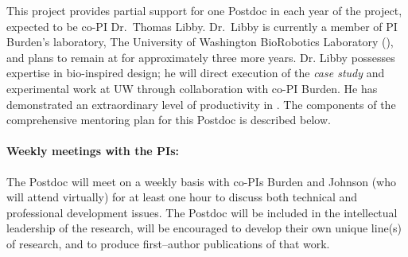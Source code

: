 \documentclass[11pt]{article}
\begin{document}


This project provides partial support for one Postdoc in each year of the project, expected to be co-PI Dr.\ Thomas Libby. 
Dr.\ Libby is currently a member of PI Burden's laboratory, The University of Washington BioRobotics Laboratory ({\BRL}),
and plans to remain at {\UW} for 
approximately three more years. 
Dr. Libby possesses expertise in bio-inspired design; he will direct execution of the \emph{case study} and experimental work at UW through collaboration with co-PI Burden.  
He has demonstrated
an extraordinary level of productivity 
in {\BRL}.
The components of the comprehensive mentoring plan 
for this Postdoc is described below.

\paragraph{Weekly meetings with the PIs:} The Postdoc will meet on a 
weekly basis with co-PIs Burden and Johnson (who will attend virtually) for at least one hour to discuss both technical and professional 
development issues. 
The Postdoc will be included in the
intellectual leadership of the research, will be encouraged to
develop their own unique line(s) of research, and to produce
first--author publications of that work. 
\end{document}
